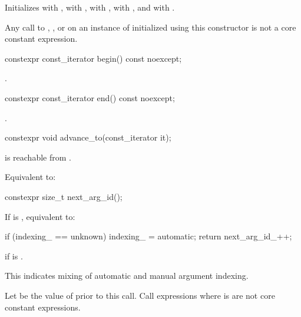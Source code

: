 \begin{itemdescr}
\pnum
\effects
Initializes
 with ,
 with ,
 with ,
 with , and
 with .
\begin{note}
Any call to
, , or 
on an instance of 
initialized using this constructor is not a core constant expression.
\end{note}
\end{itemdescr}

%
\begin{itemdecl}
constexpr const_iterator begin() const noexcept;
\end{itemdecl}

\begin{itemdescr}
\pnum
\returns
{}.
\end{itemdescr}

%
\begin{itemdecl}
constexpr const_iterator end() const noexcept;
\end{itemdecl}

\begin{itemdescr}
\pnum
\returns
{}.
\end{itemdescr}

%
\begin{itemdecl}
constexpr void advance_to(const_iterator it);
\end{itemdecl}

\begin{itemdescr}
\pnum
\expects
{} is reachable from .

\pnum
\effects
Equivalent to: 
\end{itemdescr}

%
\begin{itemdecl}
constexpr size_t next_arg_id();
\end{itemdecl}

\begin{itemdescr}
\pnum
\effects
If  is , equivalent to:
\begin{codeblock}
if (indexing_ == unknown)
  indexing_ = automatic;
return next_arg_id_++;
\end{codeblock}

\pnum
\throws
{} if  is .
\begin{note}
This indicates mixing of automatic and manual argument indexing.
\end{note}

\pnum
\remarks
Let  be the value of  prior to this call.
Call expressions where  is 
are not core constant expressions.
\end{itemdescr}

